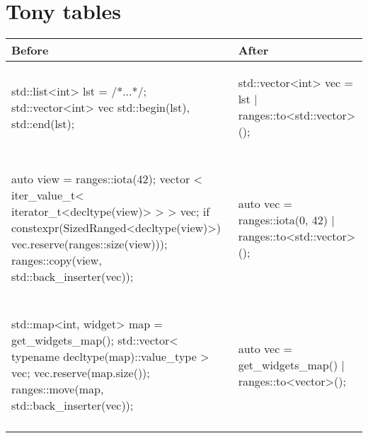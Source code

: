 \documentclass{wg21}
\begin{document}
\section{Tony tables}
\begin{center}
\begin{tabular}{l|l}
Before & After\\ \hline
\begin{minipage}[t]{0.5\textwidth}
\begin{colorblock}
std::list<int> lst = /*...*/;
std::vector<int> vec
    {std::begin(lst), std::end(lst)};
\end{colorblock}
\end{minipage}
&
\begin{minipage}[t]{0.5\textwidth}
\begin{colorblock}
std::vector<int> vec = lst | ranges::to<std::vector>();
\end{colorblock}
\end{minipage}
\\\\ \hline

\begin{minipage}[t]{0.5\textwidth}
\begin{colorblock}
auto view = ranges::iota(42);
vector <
  iter_value_t<
    iterator_t<decltype(view)>
  >
> vec;
if constexpr(SizedRanged<decltype(view)>) {
  vec.reserve(ranges::size(view)));
}
ranges::copy(view, std::back_inserter(vec));
\end{colorblock}
\end{minipage}
&
\begin{minipage}[t]{0.5\textwidth}
\begin{colorblock}
auto vec = ranges::iota(0, 42)
    | ranges::to<std::vector>();
\end{colorblock}
\end{minipage}
\\\\ \hline


\begin{minipage}[t]{0.5\textwidth}
\begin{colorblock}
std::map<int, widget> map = get_widgets_map();
std::vector<
  typename decltype(map)::value_type
> vec;
vec.reserve(map.size());
ranges::move(map, std::back_inserter(vec));
\end{colorblock}
\end{minipage}
&
\begin{minipage}[t]{0.5\textwidth}
\begin{colorblock}
auto vec = get_widgets_map()
          | ranges::to<vector>();
\end{colorblock}
\end{minipage}
\\\\ \hline

\end{tabular}
\end{center}
\end{document}
